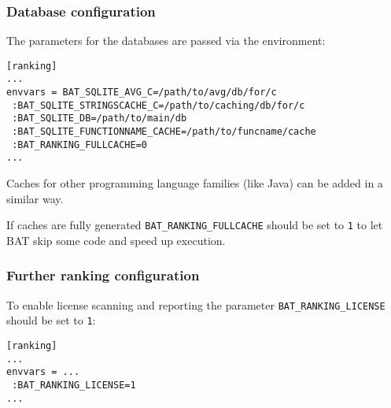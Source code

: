 \documentclass[11pt]{beamer}
\begin{document}
\begin{frame}[fragile]
\frametitle{Database configuration}
The parameters for the databases are passed via the environment:

\begin{verbatim}
[ranking]
...
envvars = BAT_SQLITE_AVG_C=/path/to/avg/db/for/c
 :BAT_SQLITE_STRINGSCACHE_C=/path/to/caching/db/for/c
 :BAT_SQLITE_DB=/path/to/main/db
 :BAT_SQLITE_FUNCTIONNAME_CACHE=/path/to/funcname/cache
 :BAT_RANKING_FULLCACHE=0
...
\end{verbatim}

Caches for other programming language families (like Java) can be added in a similar way.

If caches are fully generated \texttt{BAT\_RANKING\_FULLCACHE} should be set to \texttt{1} to let BAT skip some code and speed up execution.
\end{frame}

\begin{frame}[fragile]
\frametitle{Further ranking configuration}
To enable license scanning and reporting the parameter \texttt{BAT\_RANKING\_LICENSE} should be set to \texttt{1}:

\begin{verbatim}
[ranking]
...
envvars = ...
 :BAT_RANKING_LICENSE=1
...
\end{verbatim}
\end{frame}

\end{document}
